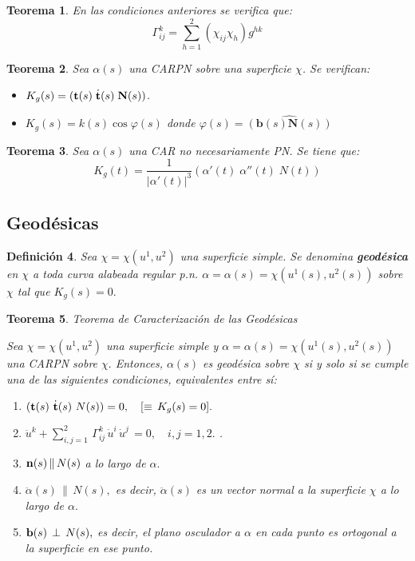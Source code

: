 \documentclass[twoside]{article}
\newtheorem{theorem}{Teorema}[section]
\newtheorem{defi}[theorem]{Definición}
\numberwithin{equation}{section}
\begin{document}
\begin{theorem}
En las condiciones anteriores se verifica que:
\[\Gamma^k_{ij} = \sum_{h=1}^2 (\chi_{ij} \chi_h ) g^{hk}\]
\end{theorem}


\begin{theorem}
Sea $\alpha(s)$ una CARPN sobre una superficie $\chi$. Se verifican:
\begin{itemize}
\item $K_g(s) = ({\bf t}(s)\; \dot{\bf t}(s) \; \textbf{N}(s) )$.
\item $K_g(s) = k(s)\cos{\varphi(s)}$ donde $\varphi(s)=\widehat{(\textbf{b}(s) \textbf{N}(s))}$
\end{itemize}
\end{theorem}

\begin{theorem} Sea $\alpha(s)$ una CAR no necesariamente PN. Se tiene que:
\[
K_g(t)=\frac{1}{|\alpha'(t)|^3}(\alpha'(t)\; \alpha''(t)\; N(t))
\]
\end{theorem}
\subsection{Geodésicas}

\begin{defi}
Sea $\chi = \chi(u^1, u^2)$ una superficie simple. Se denomina \textbf{geodésica} en $\chi$ a toda curva alabeada regular p.n. $\alpha = \alpha(s) = \chi(u^1(s), u^2(s))$ sobre $\chi$ tal que $K_g(s) = 0.$
\end{defi}

\begin{theorem} {\em Teorema de Caracterización de las Geodésicas}

Sea $\chi = \chi(u^1, u^2)$ una superficie simple y $\alpha = \alpha(s) = \chi(u^1(s), u^2(s))$ una CARPN sobre $\chi.$ Entonces, $\alpha(s)$ es geodésica sobre $\chi$ si y solo si se cumple una de las siguientes condiciones, equivalentes entre sí:

\begin{enumerate}
\item[C1] \quad $({\bf t}(s) \,\, \dot{{\bf t}}(s) \,\, N(s)) = 0, \quad [\equiv \, K_g(s) = 0].$

\item[C2] \quad $\ddot{u}^k + \sum_{i, j = 1}^2 \, \Gamma_{ij}^k \, \dot{u}^i \, \dot{u}^j \, = 0, \quad i,j = 1,2.$ .

\item[C3] \quad ${\bf n}(s) \, \| \, N(s)$ a lo largo de $\alpha.$

\item[C4] \quad $\ddot{\alpha}(s) \, \| \, N(s),$ es decir, $\ddot{\alpha}(s)$ es un vector normal a la superficie $\chi$ a lo largo de $\alpha.$

\item[C5] \quad ${\bf b}(s) \, \perp \, N(s),$ es decir, el plano osculador a $\alpha$ en cada punto es ortogonal a la superficie en ese \quad punto.
\end{enumerate}
\end{theorem}
\end{document}

